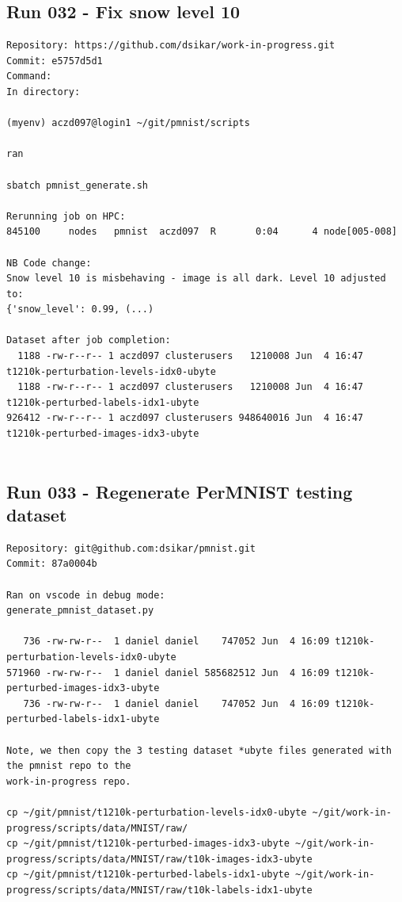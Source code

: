 \subsection{Run 032 - Fix snow level 10 }
\label{app_res:032}
\begin{verbatim}
Repository: https://github.com/dsikar/work-in-progress.git 
Commit: e5757d5d1
Command:
In directory: 

(myenv) aczd097@login1 ~/git/pmnist/scripts

ran

sbatch pmnist_generate.sh

Rerunning job on HPC:
845100     nodes   pmnist  aczd097  R       0:04      4 node[005-008]

NB Code change:
Snow level 10 is misbehaving - image is all dark. Level 10 adjusted to:
{'snow_level': 0.99, (...)

Dataset after job completion:
  1188 -rw-r--r-- 1 aczd097 clusterusers   1210008 Jun  4 16:47 t1210k-perturbation-levels-idx0-ubyte
  1188 -rw-r--r-- 1 aczd097 clusterusers   1210008 Jun  4 16:47 t1210k-perturbed-labels-idx1-ubyte
926412 -rw-r--r-- 1 aczd097 clusterusers 948640016 Jun  4 16:47 t1210k-perturbed-images-idx3-ubyte


\end{verbatim}

\subsection{Run 033 - Regenerate PerMNIST testing dataset}
\label{app_res:033}
\begin{verbatim}
Repository: git@github.com:dsikar/pmnist.git
Commit: 87a0004b

Ran on vscode in debug mode:
generate_pmnist_dataset.py

   736 -rw-rw-r--  1 daniel daniel    747052 Jun  4 16:09 t1210k-perturbation-levels-idx0-ubyte
571960 -rw-rw-r--  1 daniel daniel 585682512 Jun  4 16:09 t1210k-perturbed-images-idx3-ubyte
   736 -rw-rw-r--  1 daniel daniel    747052 Jun  4 16:09 t1210k-perturbed-labels-idx1-ubyte

Note, we then copy the 3 testing dataset *ubyte files generated with the pmnist repo to the 
work-in-progress repo.

cp ~/git/pmnist/t1210k-perturbation-levels-idx0-ubyte ~/git/work-in-progress/scripts/data/MNIST/raw/
cp ~/git/pmnist/t1210k-perturbed-images-idx3-ubyte ~/git/work-in-progress/scripts/data/MNIST/raw/t10k-images-idx3-ubyte
cp ~/git/pmnist/t1210k-perturbed-labels-idx1-ubyte ~/git/work-in-progress/scripts/data/MNIST/raw/t10k-labels-idx1-ubyte

\end{verbatim}


